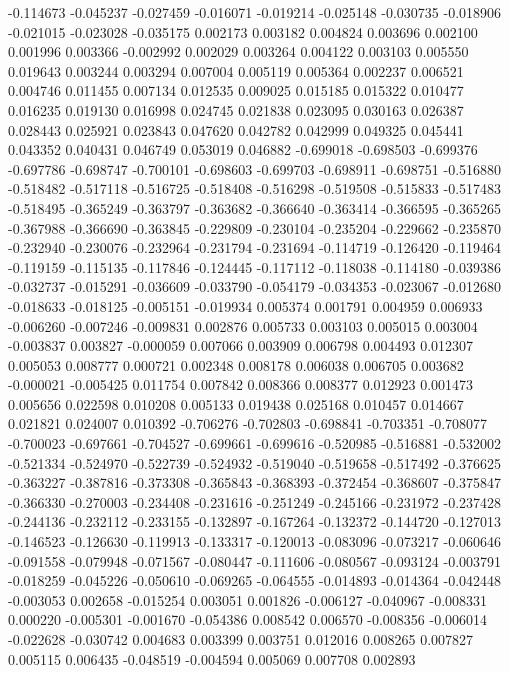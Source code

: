 -0.114673
-0.045237
-0.027459
-0.016071
-0.019214
-0.025148
-0.030735
-0.018906
-0.021015
-0.023028
-0.035175
0.002173
0.003182
0.004824
0.003696
0.002100
0.001996
0.003366
-0.002992
0.002029
0.003264
0.004122
0.003103
0.005550
0.019643
0.003244
0.003294
0.007004
0.005119
0.005364
0.002237
0.006521
0.004746
0.011455
0.007134
0.012535
0.009025
0.015185
0.015322
0.010477
0.016235
0.019130
0.016998
0.024745
0.021838
0.023095
0.030163
0.026387
0.028443
0.025921
0.023843
0.047620
0.042782
0.042999
0.049325
0.045441
0.043352
0.040431
0.046749
0.053019
0.046882
-0.699018
-0.698503
-0.699376
-0.697786
-0.698747
-0.700101
-0.698603
-0.699703
-0.698911
-0.698751
-0.516880
-0.518482
-0.517118
-0.516725
-0.518408
-0.516298
-0.519508
-0.515833
-0.517483
-0.518495
-0.365249
-0.363797
-0.363682
-0.366640
-0.363414
-0.366595
-0.365265
-0.367988
-0.366690
-0.363845
-0.229809
-0.230104
-0.235204
-0.229662
-0.235870
-0.232940
-0.230076
-0.232964
-0.231794
-0.231694
-0.114719
-0.126420
-0.119464
-0.119159
-0.115135
-0.117846
-0.124445
-0.117112
-0.118038
-0.114180
-0.039386
-0.032737
-0.015291
-0.036609
-0.033790
-0.054179
-0.034353
-0.023067
-0.012680
-0.018633
-0.018125
-0.005151
-0.019934
0.005374
0.001791
0.004959
0.006933
-0.006260
-0.007246
-0.009831
0.002876
0.005733
0.003103
0.005015
0.003004
-0.003837
0.003827
-0.000059
0.007066
0.003909
0.006798
0.004493
0.012307
0.005053
0.008777
0.000721
0.002348
0.008178
0.006038
0.006705
0.003682
-0.000021
-0.005425
0.011754
0.007842
0.008366
0.008377
0.012923
0.001473
0.005656
0.022598
0.010208
0.005133
0.019438
0.025168
0.010457
0.014667
0.021821
0.024007
0.010392
-0.706276
-0.702803
-0.698841
-0.703351
-0.708077
-0.700023
-0.697661
-0.704527
-0.699661
-0.699616
-0.520985
-0.516881
-0.532002
-0.521334
-0.524970
-0.522739
-0.524932
-0.519040
-0.519658
-0.517492
-0.376625
-0.363227
-0.387816
-0.373308
-0.365843
-0.368393
-0.372454
-0.368607
-0.375847
-0.366330
-0.270003
-0.234408
-0.231616
-0.251249
-0.245166
-0.231972
-0.237428
-0.244136
-0.232112
-0.233155
-0.132897
-0.167264
-0.132372
-0.144720
-0.127013
-0.146523
-0.126630
-0.119913
-0.133317
-0.120013
-0.083096
-0.073217
-0.060646
-0.091558
-0.079948
-0.071567
-0.080447
-0.111606
-0.080567
-0.093124
-0.003791
-0.018259
-0.045226
-0.050610
-0.069265
-0.064555
-0.014893
-0.014364
-0.042448
-0.003053
0.002658
-0.015254
0.003051
0.001826
-0.006127
-0.040967
-0.008331
0.000220
-0.005301
-0.001670
-0.054386
0.008542
0.006570
-0.008356
-0.006014
-0.022628
-0.030742
0.004683
0.003399
0.003751
0.012016
0.008265
0.007827
0.005115
0.006435
-0.048519
-0.004594
0.005069
0.007708
0.002893
